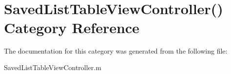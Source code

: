\section{Saved\+List\+Table\+View\+Controller() Category Reference}
\label{category_saved_list_table_view_controller_07_08}


The documentation for this category was generated from the following file\+:\begin{DoxyCompactItemize}
\item 
Saved\+List\+Table\+View\+Controller.\+m\end{DoxyCompactItemize}
